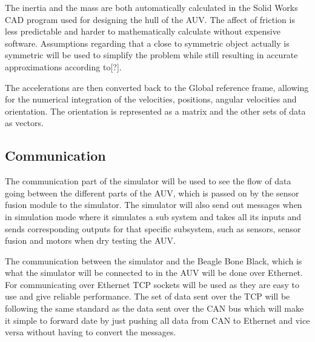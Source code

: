 The inertia and the mass are both automatically calculated in the Solid Works CAD program used for designing the hull of the AUV. The affect of friction is less predictable and harder to mathematically calculate without expensive software. Assumptions regarding that a close to symmetric object actually is symmetric will be used to simplify the problem while still resulting in accurate approximations according to[?].

The accelerations are then converted back to the Global reference frame, allowing for the numerical integration of the velocities, positions, angular velocities and orientation. The orientation is represented as a matrix and the other sets of data as vectors.
\subsection{Communication}

The communication part of the simulator will be used to see the flow of data going between the different parts of the AUV, which is passed on by the sensor fusion module to the simulator. The simulator will also send out messages when in simulation mode where it simulates a sub system and takes all its inputs and sends corresponding outputs for that specific subsystem, such as sensors, sensor fusion and motors when dry testing the AUV.

The communication between the simulator and the Beagle Bone Black, which is what the simulator will be connected to in the AUV will be done over Ethernet. For communicating over Ethernet TCP sockets will be used as they are easy to use and give reliable performance. The set of data sent over the TCP will be following the same standard as the data sent over the CAN bus which will make it simple to forward date by just pushing all data from CAN to Ethernet and vice versa without having to convert the messages.

